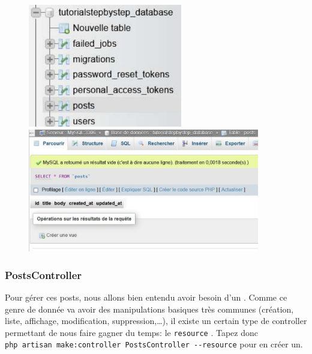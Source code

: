 \documentclass[internal]{nhitec_design}
\begin{document}
\begin{figure}[!h]
    \centering
    \begin{minipage}{0.49\textwidth}
         \centering
         \includegraphics[width=0.6\textwidth]{figures-C1/db_posts_1.pdf}
    \end{minipage}
    \begin{minipage}{0.49\textwidth}
         \centering
         \includegraphics[width=0.9\textwidth]{figures-C1/db_posts_2.pdf}
    \end{minipage}
\end{figure}

\subsubsection[PostsController][laravel.com/docs/10.x/controllers\#resource-controllers]{PostsController}

Pour gérer ces posts, nous allons bien entendu avoir besoin d'un \controller{}. Comme ce genre de donnée va avoir des manipulations basiques très communes (création, liste, affichage, modification, suppression,\ldots), il existe un certain type de controller permettant de nous faire gagner du temps: le \texttt{resource} \controller{}. Tapez donc \\
\verb|php artisan make:controller PostsController --resource| pour en créer un.
\end{document}
